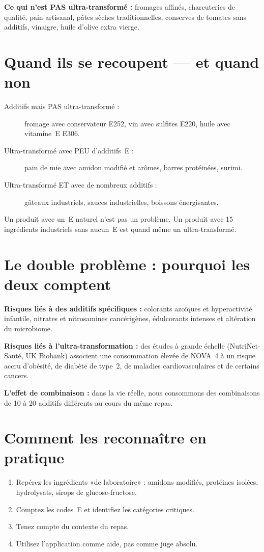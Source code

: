 \documentclass[a5paper,12pt,oneside,openany]{book}
\newcommand{\boxinfo}[2]{%
  \begin{tcolorbox}[boitebase,
    colback=bleuinfo!8!white, colframe=bleuinfo, title={#1}]
  #2\end{tcolorbox}}
\begin{document}
\textbf{Ce qui n'est PAS ultra-transformé :} fromages affinés, charcuteries
de qualité, pain artisanal, pâtes sèches traditionnelles, conserves de tomates
sans additifs, vinaigre, huile d'olive extra vierge.

\section{Quand ils se recoupent --- et quand non}

\begin{description}
  \item[Additifs mais PAS ultra-transformé :] fromage avec conservateur E252,
    vin avec sulfites E220, huile avec vitamine~E E306.
  \item[Ultra-transformé avec PEU d'additifs~E :] pain de mie avec amidon
    modifié et arômes, barres protéinées, surimi.
  \item[Ultra-transformé ET avec de nombreux additifs :] gâteaux industriels,
    sauces industrielles, boissons énergisantes.
\end{description}

\boxinfo{Conclusion}{Un produit avec un~E naturel n'est pas un problème. Un
produit avec 15 ingrédients industriels sans aucun~E est quand même
un ultra-transformé.}

\section{Le double problème : pourquoi les deux comptent}

\textbf{Risques liés à des additifs spécifiques :} colorants azoïques et
hyperactivité infantile, nitrates et nitrosamines cancérigènes, édulcorants
intenses et altération du microbiome.

\textbf{Risques liés à l'ultra-transformation :} des études à grande échelle
(NutriNet-Santé, UK Biobank) associent une consommation élevée de NOVA~4 à
un risque accru d'obésité, de diabète de type~2, de maladies cardiovasculaires
et de certains cancers.

\textbf{L'effet de combinaison :} dans la vie réelle, nous consommons des
combinaisons de 10 à 20 additifs différents au cours du même repas.

\section{Comment les reconnaître en pratique}

\begin{enumerate}
  \item Repérez les ingrédients «de laboratoire» : amidons modifiés, protéines
    isolées, hydrolysats, sirops de glucose-fructose.
  \item Comptez les codes~E et identifiez les catégories critiques.
  \item Tenez compte du contexte du repas.
  \item Utilisez l'application comme aide, pas comme juge absolu.
\end{enumerate}
\end{document}
